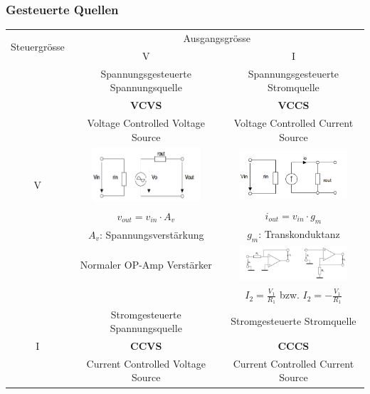         \subsubsection{Gesteuerte Quellen}
			\begin{tabular}{|c|c|c|}
				\hline
				\multirow{2}{*}{Steuergrösse} & \multicolumn{2}{c|}{Ausgangsgrösse}\\ \cline{2-3}
				& V & I \\ \hline
				\multirow{8}{*}{V}	& Spannungsgesteuerte Spannungsquelle	& Spannungsgesteuerte Stromquelle		\\
									& \bf{VCVS}								& \bf{VCCS}								\\
									& Voltage Controlled Voltage Source		& Voltage Controlled Current Source		\\ \cline{2-3}
									& \includegraphics[width=4cm,trim=0 0 0 -5]{./images/vcvs.png}	
									& \includegraphics[width=4cm,trim=0 0 0 -5]{./images/vccs.png}					\\ \cline{2-3}
									& $v_{out}=v_{in} \cdot A_v$			& $i_{out} = v_{in} \cdot g_m$			\\
									& $A_v$: Spannungsverstärkung			& $g_m$: Transkonduktanz				\\ \cline{2-3}
									& Normaler OP-Amp Verstärker
									& \includegraphics[width=4cm,trim=0 0 0 -5]{./images/vccs_schaltung.png}		\\
									&	& $I_2=\frac{V_1}{R_1}$ bzw. $I_2=-\frac{V_1}{R_1}$							\\ 	\hline	
				\multirow{8}{*}{I}	& Stromgesteuerte Spannungsquelle		& Stromgesteuerte Stromquelle			\\
									& \bf{CCVS}								& \bf{CCCS}								\\
									& Current Controlled Voltage Source		& Current Controlled Current Source		\\ \cline{2-3}

\end{tabular}
